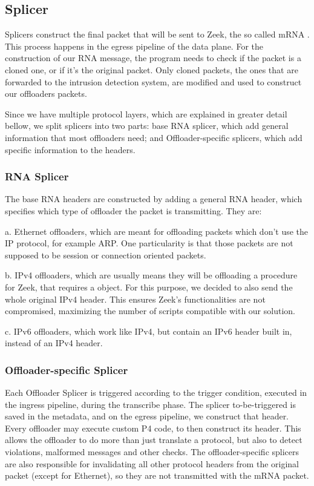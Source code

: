 \subsection{Splicer}

Splicers construct the final packet that will be sent to Zeek, the so called mRNA \cite{RNA2022}. This process happens in the egress pipeline of the data plane. For the construction of our RNA message, the program needs to check if the packet is a cloned one, or if it's the original packet. Only cloned packets, the ones that are forwarded to the intrusion detection system, are modified and used to construct our offloaders packets.

Since we have multiple protocol layers, which are explained in greater detail bellow, we split splicers into two parts: base RNA splicer, which add general information that most offloaders need; and Offloader-specific splicers, which add specific information to the headers.

\subsubsection{RNA Splicer}

The base RNA headers are constructed by adding a general RNA header, which specifies which type of offloader the packet is transmitting. They are: 

a. Ethernet offloaders, which are meant for offloading packets which don't use the IP protocol, for example ARP. One particularity is that those packets are not supposed to be session or connection oriented packets.

b. IPv4 offloaders, which are usually means they will be offloading a procedure for Zeek, that requires a \zeekconn{} object. For this purpose, we decided to also send the whole original IPv4 header. This ensures Zeek's functionalities are not compromised, maximizing the number of scripts compatible with our solution.

c. IPv6 offloaders, which work like IPv4, but contain an IPv6 header built in, instead of an IPv4 header.

\subsubsection{Offloader-specific Splicer}

Each Offloader Splicer is triggered according to the trigger condition, executed in the ingress pipeline, during the transcribe phase. The splicer to-be-triggered is saved in the metadata, and on the egress pipeline, we construct that header. Every offloader may execute custom P4 code, to then construct its header. This allows the offloader to do more than just translate a protocol, but also to detect violations, malformed messages and other checks. The offloader-specific splicers are also responsible for invalidating all other protocol headers from the original packet (except for Ethernet), so they are not transmitted with the mRNA packet.

